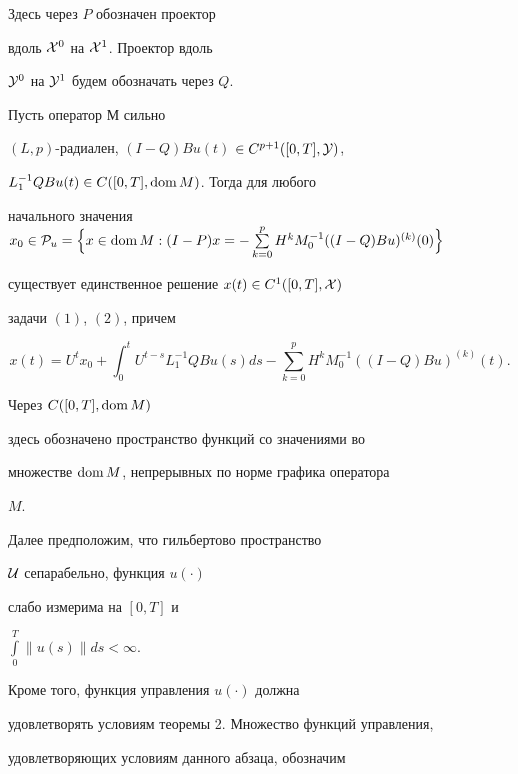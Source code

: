Здесь через $P$ обозначен проектор


вдоль ${\cal X}^0$ на ${\cal X}^1$. Проектор вдоль


${\cal Y}^0$ на ${\cal Y}^1$ будем обозначать через $Q$.





\begin{thm}


Пусть оператор $М$ сильно


$(L,p)$-радиален, $(I-Q)B u(t)$ $\in C^{p+1}([0,T],{\cal Y})$,


$L^{-1}_{1}Q B u(t) \in C([0,T],\operatorname{dom} M)$. Тогда для любого


начального значения $x_0 \in {\cal P}_u =\Big\{x \in


\dom M:(I-P)x= -\sum\limits_{k=0}^p H^k M^{-1}_0((I-Q)B u)^{(k)}(0)\Big\}$


существует единственное решение $x(t) \in C^1([0,T],{\cal X})$


задачи $(1)$, $(2)$, причем


$$


x(t)=U^t x_0+\int_0^t U^{t-s}L^{-1}_1Q B u(s)ds-


\sum\limits_{k=0}^p H^k M_0^{-1}((I-Q)B u)^{(k)}(t).


$$


\end{thm}





Через $C([0,T],\operatorname{dom} M)$


здесь обозначено пространство функций со значениями во


множестве $\operatorname{dom} M$, непрерывных по норме графика оператора


$M$.





Далее предположим, что гильбертово пространство


${\cal U}$ сепарабельно, функция $u(\cdot)$


слабо измерима на $[0,T]$ и


$\int\limits_0^T \|u(s)\|ds<\infty$.


Кроме того, функция управления $u(\cdot)$ должна


удовлетворять условиям теоремы 2. Множество функций управления,


удовлетворяющих условиям данного абзаца, обозначим


